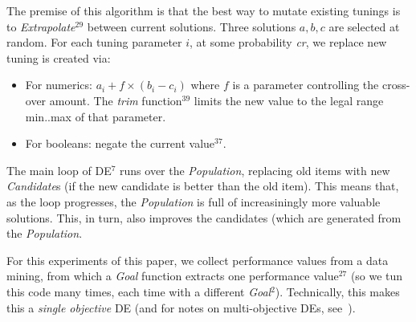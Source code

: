 \documentclass{sig-alternative}
\newcommand{\bi}{\begin{itemize}[leftmargin=0.4cm]}
\newcommand{\ei}{\end{itemize}}
\begin{document}
The premise of this algorithm is that the best way to mutate existing tunings
is to {\em Extrapolate}$^{29}$
between current solutions.  Three solutions $a,b,c$ are selected at random.
For each tuning parameter $i$, at some probability {\em cr}, we replace  new tuning is created
via:
\bi
\item For numerics: $a_i+f \times (b_i - c_i)$   where $f$ is a parameter
controlling the cross-over amount.  The {\em trim} function$^{39}$ limits the new
value to the legal range min..max of that parameter.
\item For booleans:  negate the current value$^{37}$.
\ei
The main loop of DE$^7$ runs over the {\em Population}, replacing old items
with new {\em Candidate}s (if the new candidate is better than the old item).
This means that, as the loop progresses, the {\em Population} is full of increasiningly
more valuable solutions. This, in turn, also improves  the candidates (which are generated
from the {\em Population}.

For this experiments of this paper, we collect performance
values from a data mining, from which a {\em Goal} function extracts one 
performance value$^{27}$ (so we tun this code many times, each time with
a different {\em Goal}$^2$).  Technically, this makes this a  {\em single objective} DE (and for notes on multi-objective DEs, see~\cite{Coello05,zhang07,5583335}).


\end{document}
